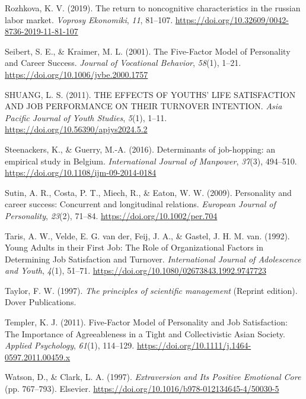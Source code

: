 \documentclass[
]{interact}
\newlength{\cslhangindent}
\newenvironment{CSLReferences}[2] %
 {\begin{list}{}{%
  \setlength{\itemindent}{0pt}
  \setlength{\leftmargin}{0pt}
  \setlength{\parsep}{0pt}
  \ifodd #1
   \setlength{\leftmargin}{\cslhangindent}
   \setlength{\itemindent}{-1\cslhangindent}
  \fi
  \setlength{\itemsep}{#2\baselineskip}}}
 {\end{list}}
\begin{document}
\begin{CSLReferences}{1}{0}
Rozhkova, K. V. (2019). The return to noncognitive characteristics in
the russian labor market. \emph{Voprosy Ekonomiki}, \emph{11}, 81--107.
\url{https://doi.org/10.32609/0042-8736-2019-11-81-107}

Seibert, S. E., \& Kraimer, M. L. (2001). The Five-Factor Model of
Personality and Career Success. \emph{Journal of Vocational Behavior},
\emph{58}(1), 1--21. \url{https://doi.org/10.1006/jvbe.2000.1757}

SHUANG, L. S. (2011). THE EFFECTS OF YOUTHS{'} LIFE SATISFACTION AND JOB
PERFORMANCE ON THEIR TURNOVER INTENTION. \emph{Asia Pacific Journal of
Youth Studies}, \emph{5}(1), 1--11.
\url{https://doi.org/10.56390/apjys2024.5.2}

Steenackers, K., \& Guerry, M.-A. (2016). Determinants of job-hopping:
an empirical study in Belgium. \emph{International Journal of Manpower},
\emph{37}(3), 494--510. \url{https://doi.org/10.1108/ijm-09-2014-0184}

Sutin, A. R., Costa, P. T., Miech, R., \& Eaton, W. W. (2009).
Personality and career success: Concurrent and longitudinal relations.
\emph{European Journal of Personality}, \emph{23}(2), 71--84.
\url{https://doi.org/10.1002/per.704}

Taris, A. W., Velde, E. G. van der, Feij, J. A., \& Gastel, J. H. M.
van. (1992). Young Adults in their First Job: The Role of Organizational
Factors in Determining Job Satisfaction and Turnover.
\emph{International Journal of Adolescence and Youth}, \emph{4}(1),
51--71. \url{https://doi.org/10.1080/02673843.1992.9747723}

Taylor, F. W. (1997). \emph{The principles of scientific management}
(Reprint edition). Dover Publications.

Templer, K. J. (2011). Five{-}Factor Model of Personality and Job
Satisfaction: The Importance of Agreeableness in a Tight and
Collectivistic Asian Society. \emph{Applied Psychology}, \emph{61}(1),
114--129. \url{https://doi.org/10.1111/j.1464-0597.2011.00459.x}

Watson, D., \& Clark, L. A. (1997). \emph{Extraversion and Its Positive
Emotional Core} (pp. 767--793). Elsevier.
\url{https://doi.org/10.1016/b978-012134645-4/50030-5}


\end{CSLReferences}
\end{document}
